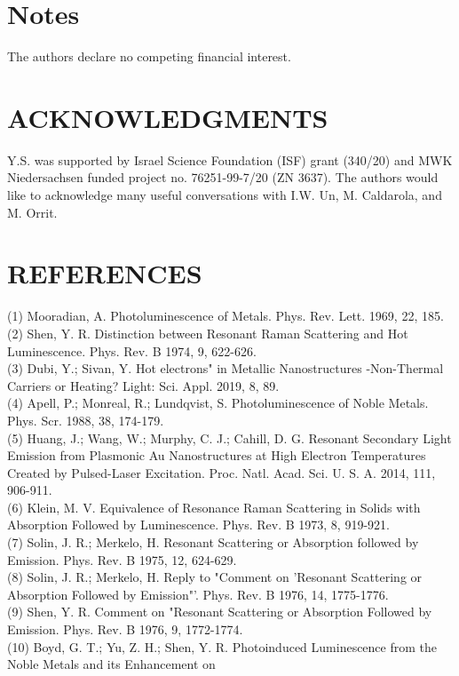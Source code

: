 \documentclass[10pt]{article}
\begin{document}
\section*{Notes}
The authors declare no competing financial interest.

\section*{ACKNOWLEDGMENTS}
Y.S. was supported by Israel Science Foundation (ISF) grant (340/20) and MWK Niedersachsen funded project no. 76251-99-7/20 (ZN 3637). The authors would like to acknowledge many useful conversations with I.W. Un, M. Caldarola, and M. Orrit.

\section*{REFERENCES}
(1) Mooradian, A. Photoluminescence of Metals. Phys. Rev. Lett. 1969, 22, 185.\\
(2) Shen, Y. R. Distinction between Resonant Raman Scattering and Hot Luminescence. Phys. Rev. B 1974, 9, 622-626.\\
(3) Dubi, Y.; Sivan, Y. Hot electrons" in Metallic Nanostructures -Non-Thermal Carriers or Heating? Light: Sci. Appl. 2019, 8, 89.\\
(4) Apell, P.; Monreal, R.; Lundqvist, S. Photoluminescence of Noble Metals. Phys. Scr. 1988, 38, 174-179.\\
(5) Huang, J.; Wang, W.; Murphy, C. J.; Cahill, D. G. Resonant Secondary Light Emission from Plasmonic Au Nanostructures at High Electron Temperatures Created by Pulsed-Laser Excitation. Proc. Natl. Acad. Sci. U. S. A. 2014, 111, 906-911.\\
(6) Klein, M. V. Equivalence of Resonance Raman Scattering in Solids with Absorption Followed by Luminescence. Phys. Rev. B 1973, 8, 919-921.\\
(7) Solin, J. R.; Merkelo, H. Resonant Scattering or Absorption followed by Emission. Phys. Rev. B 1975, 12, 624-629.\\
(8) Solin, J. R.; Merkelo, H. Reply to "Comment on 'Resonant Scattering or Absorption Followed by Emission"'. Phys. Rev. B 1976, 14, 1775-1776.\\
(9) Shen, Y. R. Comment on "Resonant Scattering or Absorption Followed by Emission. Phys. Rev. B 1976, 9, 1772-1774.\\
(10) Boyd, G. T.; Yu, Z. H.; Shen, Y. R. Photoinduced Luminescence from the Noble Metals and its Enhancement on
\end{document}
